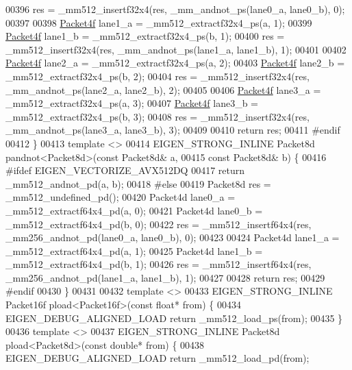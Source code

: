 \begin{DoxyCode}
00396   res = \_mm512\_insertf32x4(res, \_mm\_andnot\_ps(lane0\_a, lane0\_b), 0);
00397 
00398   \hyperlink{struct_eigen_1_1internal_1_1_packet4f}{Packet4f} lane1\_a = \_mm512\_extractf32x4\_ps(a, 1);
00399   \hyperlink{struct_eigen_1_1internal_1_1_packet4f}{Packet4f} lane1\_b = \_mm512\_extractf32x4\_ps(b, 1);
00400   res = \_mm512\_insertf32x4(res, \_mm\_andnot\_ps(lane1\_a, lane1\_b), 1);
00401 
00402   \hyperlink{struct_eigen_1_1internal_1_1_packet4f}{Packet4f} lane2\_a = \_mm512\_extractf32x4\_ps(a, 2);
00403   \hyperlink{struct_eigen_1_1internal_1_1_packet4f}{Packet4f} lane2\_b = \_mm512\_extractf32x4\_ps(b, 2);
00404   res = \_mm512\_insertf32x4(res, \_mm\_andnot\_ps(lane2\_a, lane2\_b), 2);
00405 
00406   \hyperlink{struct_eigen_1_1internal_1_1_packet4f}{Packet4f} lane3\_a = \_mm512\_extractf32x4\_ps(a, 3);
00407   \hyperlink{struct_eigen_1_1internal_1_1_packet4f}{Packet4f} lane3\_b = \_mm512\_extractf32x4\_ps(b, 3);
00408   res = \_mm512\_insertf32x4(res, \_mm\_andnot\_ps(lane3\_a, lane3\_b), 3);
00409 
00410   \textcolor{keywordflow}{return} res;
00411 \textcolor{preprocessor}{#endif}
00412 \}
00413 \textcolor{keyword}{template} <>
00414 EIGEN\_STRONG\_INLINE Packet8d pandnot<Packet8d>(\textcolor{keyword}{const} Packet8d& a,
00415                                                \textcolor{keyword}{const} Packet8d& b) \{
00416 \textcolor{preprocessor}{#ifdef EIGEN\_VECTORIZE\_AVX512DQ}
00417   \textcolor{keywordflow}{return} \_mm512\_andnot\_pd(a, b);
00418 \textcolor{preprocessor}{#else}
00419   Packet8d res = \_mm512\_undefined\_pd();
00420   Packet4d lane0\_a = \_mm512\_extractf64x4\_pd(a, 0);
00421   Packet4d lane0\_b = \_mm512\_extractf64x4\_pd(b, 0);
00422   res = \_mm512\_insertf64x4(res, \_mm256\_andnot\_pd(lane0\_a, lane0\_b), 0);
00423 
00424   Packet4d lane1\_a = \_mm512\_extractf64x4\_pd(a, 1);
00425   Packet4d lane1\_b = \_mm512\_extractf64x4\_pd(b, 1);
00426   res = \_mm512\_insertf64x4(res, \_mm256\_andnot\_pd(lane1\_a, lane1\_b), 1);
00427 
00428   \textcolor{keywordflow}{return} res;
00429 \textcolor{preprocessor}{#endif}
00430 \}
00431 
00432 \textcolor{keyword}{template} <>
00433 EIGEN\_STRONG\_INLINE Packet16f pload<Packet16f>(\textcolor{keyword}{const} \textcolor{keywordtype}{float}* from) \{
00434   EIGEN\_DEBUG\_ALIGNED\_LOAD \textcolor{keywordflow}{return} \_mm512\_load\_ps(from);
00435 \}
00436 \textcolor{keyword}{template} <>
00437 EIGEN\_STRONG\_INLINE Packet8d pload<Packet8d>(\textcolor{keyword}{const} \textcolor{keywordtype}{double}* from) \{
00438   EIGEN\_DEBUG\_ALIGNED\_LOAD \textcolor{keywordflow}{return} \_mm512\_load\_pd(from);

\end{DoxyCode}
